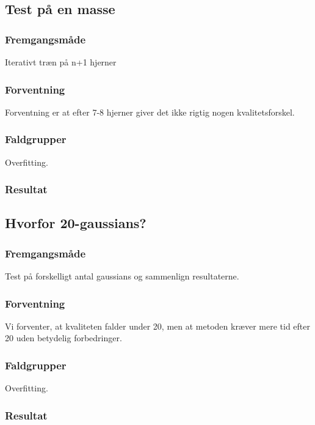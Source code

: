\subsection{Test på en masse}
\subsubsection{Fremgangsmåde}
Iterativt træn på n+1 hjerner

\subsubsection{Forventning}
Forventning er at efter 7-8 hjerner giver det ikke rigtig nogen
kvalitetsforskel.

\subsubsection{Faldgrupper}
Overfitting. 


\subsubsection{Resultat}

\subsection{Hvorfor 20-gaussians?}

\subsubsection{Fremgangsmåde}
Test på forskelligt antal gaussians og sammenlign resultaterne.

\subsubsection{Forventning}
Vi forventer, at kvaliteten falder under 20, men at metoden kræver mere tid
efter 20 uden betydelig forbedringer.

\subsubsection{Faldgrupper}
Overfitting. 

\subsubsection{Resultat}



